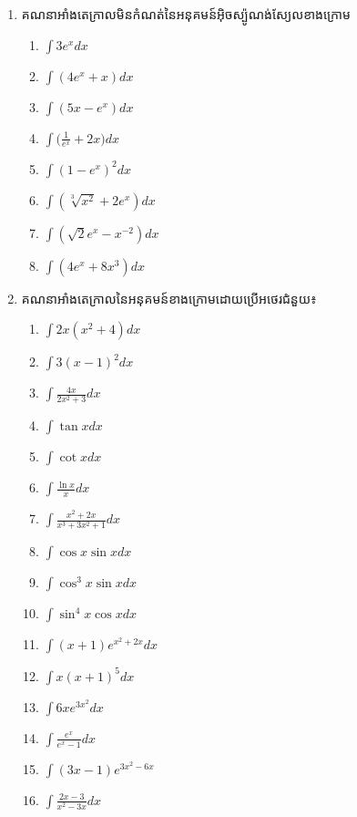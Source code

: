 \documentclass[12pt,a4paper]{article}
\begin{document}
\begin{enumerate}[I]
\begin{multicols}{4}
\begin{enumerate}[a]
			\end{enumerate}
		\end{multicols}
		\item គណនាអាំងតេក្រាលមិនកំណត់នៃអនុគមន៍អ៊ិចស្ប៉ូណង់ស្យែលខាងក្រោម
		\begin{multicols}{4}
			\begin{enumerate}[a]
				\item $\int 3e^x dx$
				\item $\int (4e^x+x) dx$
				\item $\int (5x-e^x) dx$
				\item $\int \bigg(\frac{1}{e^x}+2x\bigg) dx$
				\item $\int (1-e^x)^2 dx$ 
				\item $\int (\sqrt[3]{x^2}+2e^x) dx$ 
				\item $\int (\sqrt{2}e^x-x^{-2}) dx$
				\item $\int (4e^x+8x^3) dx$
			\end{enumerate}
		\end{multicols}
		\item គណនាអាំងតេក្រាលនៃអនុគមន៍ខាងក្រោមដោយប្រើអថេរជំនួយ៖
		\begin{multicols}{4}
			\begin{enumerate}[a]
				\item $\int 2x(x^2+4) dx$
				\item $\int 3(x-1)^2 dx$
				\item $\int \frac{4x}{2x^2+3} dx$
				\item $\int \tan x dx$
				\item $\int \cot x dx$
				\item $\int \frac{\ln x}{x} dx$
				\item $\int \frac{x^2+2x}{x^3+3x^2+1} dx$
				\item $\int \cos x\sin x dx$ 
				\item $\int \cos^3x\sin x dx$
				\item $\int \sin^4x\cos x dx$ 
				\item $\int (x+1)e^{x^2+2x} dx$
				\item $\int x(x+1)^5 dx$
				\item $\int 6xe^{3x^2} dx$
				\item $\int \frac{e^x}{e^x-1} dx$
				\item $\int (3x-1)e^{3x^2-6x}$
				\item $\int \frac{2x-3}{x^2-3x} dx$
			\end{enumerate}
		\end{multicols}
		\begin{center}

\end{center}
\end{enumerate}
\end{document}
